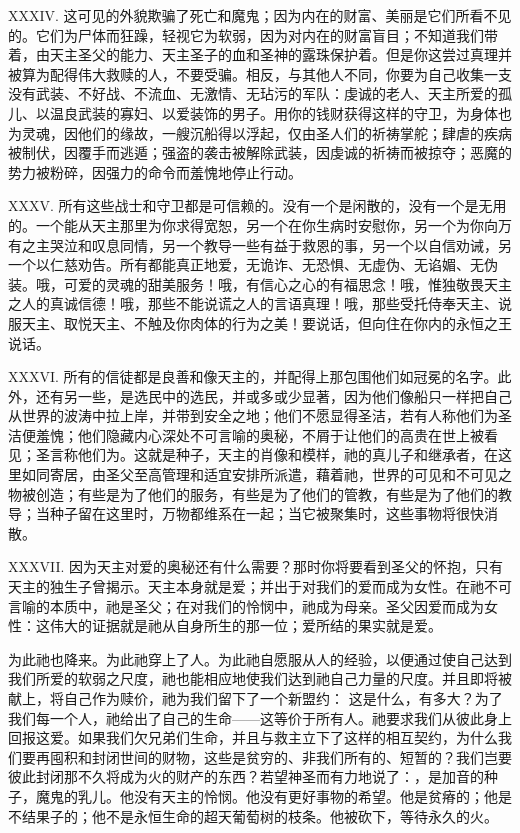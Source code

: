 XXXIV. 这可见的外貌欺骗了死亡和魔鬼；因为内在的财富、美丽是它们所看不见的。它们为尸体而狂躁，轻视它为软弱，因为对内在的财富盲目；不知道我们带着，由天主圣父的能力、天主圣子的血和圣神的露珠保护着。但是你这尝过真理并被算为配得伟大救赎的人，不要受骗。相反，与其他人不同，你要为自己收集一支没有武装、不好战、不流血、无激情、无玷污的军队：虔诚的老人、天主所爱的孤儿、以温良武装的寡妇、以爱装饰的男子。用你的钱财获得这样的守卫，为身体也为灵魂，因他们的缘故，一艘沉船得以浮起，仅由圣人们的祈祷掌舵；肆虐的疾病被制伏，因覆手而逃遁；强盗的袭击被解除武装，因虔诚的祈祷而被掠夺；恶魔的势力被粉碎，因强力的命令而羞愧地停止行动。\par

XXXV. 所有这些战士和守卫都是可信赖的。没有一个是闲散的，没有一个是无用的。一个能从天主那里为你求得宽恕，另一个在你生病时安慰你，另一个为你向万有之主哭泣和叹息同情，另一个教导一些有益于救恩的事，另一个以自信劝诫，另一个以仁慈劝告。所有都能真正地爱，无诡诈、无恐惧、无虚伪、无谄媚、无伪装。哦，可爱的灵魂的甜美服务！哦，有信心之心的有福思念！哦，惟独敬畏天主之人的真诚信德！哦，那些不能说谎之人的言语真理！哦，那些受托侍奉天主、说服天主、取悦天主、不触及你肉体的行为之美！要说话，但向住在你内的永恒之王说话。\par

XXXVI. 所有的信徒都是良善和像天主的，并配得上那包围他们如冠冕的名字。此外，还有另一些，是选民中的选民，并或多或少显著，因为他们像船只一样把自己从世界的波涛中拉上岸，并带到安全之地；他们不愿显得圣洁，若有人称他们为圣洁便羞愧；他们隐藏内心深处不可言喻的奥秘，不屑于让他们的高贵在世上被看见；圣言称他们为。这就是种子，天主的肖像和模样，祂的真儿子和继承者，在这里如同寄居，由圣父至高管理和适宜安排所派遣，藉着祂，世界的可见和不可见之物被创造；有些是为了他们的服务，有些是为了他们的管教，有些是为了他们的教导；当种子留在这里时，万物都维系在一起；当它被聚集时，这些事物将很快消散。\par

XXXVII. 因为天主对爱的奥秘还有什么需要？那时你将要看到圣父的怀抱，只有天主的独生子曾揭示。天主本身就是爱；并出于对我们的爱而成为女性。在祂不可言喻的本质中，祂是圣父；在对我们的怜悯中，祂成为母亲。圣父因爱而成为女性：这伟大的证据就是祂从自身所生的那一位；爱所结的果实就是爱。\par

为此祂也降来。为此祂穿上了人。为此祂自愿服从人的经验，以便通过使自己达到我们所爱的软弱之尺度，祂也能相应地使我们达到祂自己力量的尺度。并且即将被献上，将自己作为赎价，祂为我们留下了一个新盟约： 这是什么，有多大？为了我们每一个人，祂给出了自己的生命——这等价于所有人。祂要求我们从彼此身上回报这爱。如果我们欠兄弟们生命，并且与救主立下了这样的相互契约，为什么我们要再囤积和封闭世间的财物，这些是贫穷的、非我们所有的、短暂的？我们岂要彼此封闭那不久将成为火的财产的东西？若望神圣而有力地说了：，是加音的种子，魔鬼的乳儿。他没有天主的怜悯。他没有更好事物的希望。他是贫瘠的；他是不结果子的；他不是永恒生命的超天葡萄树的枝条。他被砍下，等待永久的火。\par

